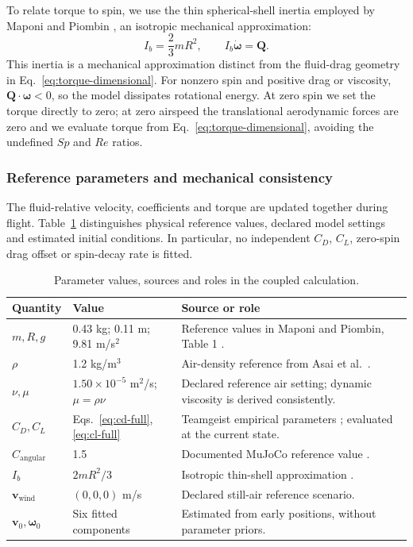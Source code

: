 \documentclass[12pt,letterpaper]{article}
\begin{document}
To relate torque to spin, we use the thin spherical-shell inertia employed by Maponi and Piombin \cite{maponi}, an isotropic mechanical approximation:
\begin{equation}
I_b=\frac23mR^2,\qquad I_b\dot{\boldsymbol\omega}=\boldsymbol Q.
\label{eq:spin-evolution}\end{equation}
This inertia is a mechanical approximation distinct from the fluid-drag geometry in Eq.~\eqref{eq:torque-dimensional}. For nonzero spin and positive drag or viscosity, $\boldsymbol Q\cdot\boldsymbol\omega<0$, so the model dissipates rotational energy. At zero spin we set the torque directly to zero; at zero airspeed the translational aerodynamic forces are zero and we evaluate torque from Eq.~\eqref{eq:torque-dimensional}, avoiding the undefined $Sp$ and $Re$ ratios.

\subsubsection{Reference parameters and mechanical consistency}
The fluid-relative velocity, coefficients and torque are updated together during flight. Table~\ref{tab:parameter-sources} distinguishes physical reference values, declared model settings and estimated initial conditions. In particular, no independent $C_D$, $C_L$, zero-spin drag offset or spin-decay rate is fitted.
\begin{table}[H]\centering\small
\caption{Parameter values, sources and roles in the coupled calculation.}\label{tab:parameter-sources}
\begin{tabular}{p{}p{}p{}}\toprule
Quantity & Value & Source or role\\\midrule
$m,R,g$ & 0.43 kg; 0.11 m; 9.81 m/s$^2$ & Reference values in Maponi and Piombin, Table 1 \cite{maponi}.\\
$\rho$ & 1.2 kg/m$^3$ & Air-density reference from Asai et al.\ \cite{asai2007}.\\
$\nu,\mu$ & $1.50\times10^{-5}$ m$^2$/s; $\mu=\rho\nu$ & Declared reference air setting; dynamic viscosity is derived consistently.\\
$C_D,C_L$ & Eqs.~\eqref{eq:cd-full}, \eqref{eq:cl-full} & Teamgeist empirical parameters \cite{kiratidis2018}; evaluated at the current state.\\
$C_{\mathrm{angular}}$ & 1.5 & Documented MuJoCo reference value \cite{mujoco381}.\\
$I_b$ & $2mR^2/3$ & Isotropic thin-shell approximation \cite{maponi}.\\
$\boldsymbol v_{\mathrm{wind}}$ & $(0,0,0)$ m/s & Declared still-air reference scenario.\\
$\boldsymbol v_0,\boldsymbol\omega_0$ & Six fitted components & Estimated from early positions, without parameter priors.\\\bottomrule
\end{tabular}\end{table}
\end{document}
